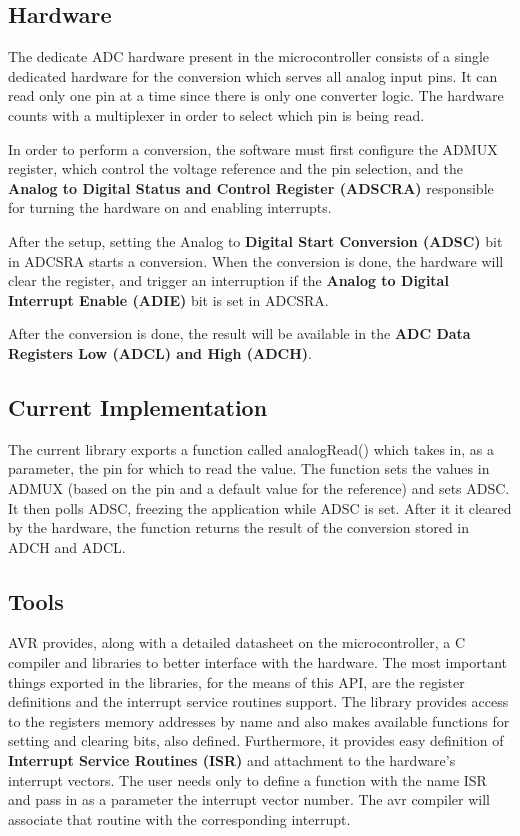 \documentclass{article}
\begin{document}
\subsection{Hardware}
\tab The dedicate ADC hardware present in the microcontroller consists of a single dedicated hardware for the conversion which serves all analog input pins. It can read only one pin at a time since there is only one converter logic. The hardware counts with a multiplexer in order to select which pin is being read.
\par In order to perform a conversion, the software must first configure the ADMUX register, which control the voltage reference and the pin selection, and the \textbf{Analog to Digital Status and Control Register (ADSCRA)} responsible for turning the hardware on and enabling interrupts.
\par After the setup, setting the Analog to \textbf{Digital Start Conversion (ADSC)} bit in ADCSRA starts a conversion. When the conversion is done, the hardware will clear the register, and trigger an interruption if the \textbf{Analog to Digital Interrupt Enable (ADIE)} bit is set in ADCSRA. 
\par After the conversion is done, the result will be available in the \textbf{ADC Data Registers Low (ADCL) and High (ADCH)}.

\subsection{Current Implementation}
\tab The current library exports a function called analogRead() which takes in, as a parameter, the pin for which to read the value. The function sets the values in ADMUX (based on the pin and a default value for the reference) and sets ADSC. It then polls ADSC, freezing the application while ADSC is set. After it it cleared by the hardware, the function returns the result of the conversion stored in ADCH and ADCL.

\subsection{Tools}
\tab AVR provides, along with a detailed datasheet on the microcontroller, a C compiler and libraries to better interface with the hardware. The most important things exported in the libraries, for the means of this API, are the register definitions and the interrupt service routines support. The library provides access to the registers memory addresses by name and also makes available functions for setting and clearing bits, also defined. Furthermore, it provides easy definition of \textbf{Interrupt Service Routines (ISR)} and attachment to the hardware's interrupt vectors. The user needs only to define a function with the name ISR and pass in as a parameter the interrupt vector number. The avr compiler will associate that routine with the corresponding interrupt.
\end{document}
